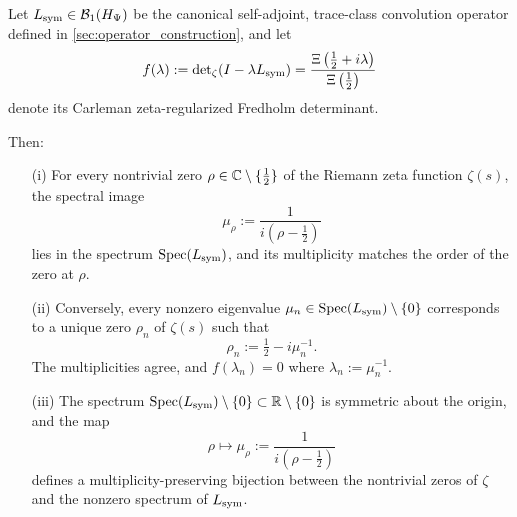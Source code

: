 \begin{lemma}
\label{lem:spectrum_zero_bijection}
Let \( L_{\mathrm{sym}} \in \mathcal{B}_1(H_{\Psi}) \) be the canonical self-adjoint, trace-class convolution operator defined in \cref{sec:operator_construction}, and let
\[
f(\lambda) := \det\nolimits_\zeta(I - \lambda L_{\mathrm{sym}}) = \frac{\Xi\left( \tfrac{1}{2} + i\lambda \right)}{\Xi\left( \tfrac{1}{2} \right)}
\]
denote its Carleman zeta-regularized Fredholm determinant.

Then:

\begin{enumerate}
  \item[\textnormal{(i)}] For every nontrivial zero \( \rho \in \mathbb{C} \setminus \{\tfrac{1}{2}\} \) of the Riemann zeta function \( \zeta(s) \), the spectral image
  \[
  \mu_\rho := \frac{1}{i(\rho - \tfrac{1}{2})}
  \]
  lies in the spectrum \( \operatorname{Spec}(L_{\mathrm{sym}}) \), and its multiplicity matches the order of the zero at \( \rho \).

  \item[\textnormal{(ii)}] Conversely, every nonzero eigenvalue \( \mu_n \in \operatorname{Spec}(L_{\mathrm{sym}}) \setminus \{0\} \) corresponds to a unique zero \( \rho_n \) of \( \zeta(s) \) such that
  \[
  \rho_n := \tfrac{1}{2} - i \mu_n^{-1}.
  \]
  The multiplicities agree, and \( f(\lambda_n) = 0 \) where \( \lambda_n := \mu_n^{-1} \).

  \item[\textnormal{(iii)}] The spectrum \( \operatorname{Spec}(L_{\mathrm{sym}}) \setminus \{0\} \subset \mathbb{R} \setminus \{0\} \) is symmetric about the origin, and the map
  \[
  \rho \mapsto \mu_\rho := \frac{1}{i(\rho - \tfrac{1}{2})}
  \]
  defines a multiplicity-preserving bijection between the nontrivial zeros of \( \zeta \) and the nonzero spectrum of \( L_{\mathrm{sym}} \).
\end{enumerate}
\end{lemma}
